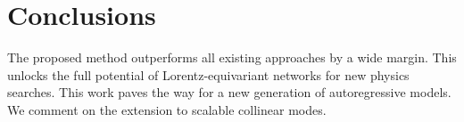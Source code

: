 \section{Conclusions}\label{sec:conclusions}

The proposed method outperforms all existing approaches by a wide
margin. This unlocks the full potential of Lorentz-equivariant networks
for new physics searches. This work paves the way for a new generation
of autoregressive models. We comment on the extension to scalable
collinear modes.

